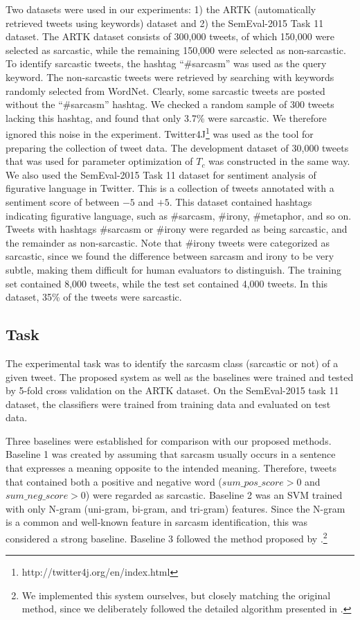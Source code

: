 \documentclass[english]{jnlp_1.4}
\begin{document}
Two datasets were used in our experiments: 1) the ARTK (automatically retrieved tweets using keywords) dataset and 2) the SemEval-2015 Task 11 dataset.
The ARTK dataset consists of 300,000 tweets, of which 150,000 were selected as sarcastic, while the remaining 150,000 were selected as non-sarcastic.
To identify sarcastic tweets, the hashtag ``\#sarcasm'' was used as the query keyword.
The non-sarcastic tweets were retrieved by searching with keywords randomly selected from WordNet.
Clearly, some sarcastic tweets are posted without the ``\#sarcasm'' hashtag.
We checked a random sample of 300 tweets lacking this hashtag, and found that only 3.7\% were sarcastic.
We therefore ignored this noise in the experiment.
Twitter4J\footnote{http://twitter4j.org/en/index.html} was used as the tool for preparing the collection of tweet data.
The development dataset of 30,000 tweets that was used for parameter optimization of $T_c$ was constructed in the same way.
We also used the SemEval-2015 Task 11 dataset for sentiment analysis of figurative language in Twitter.
This is a collection of tweets annotated with a sentiment score of between $-5$ and $+5$.
This dataset contained hashtags indicating figurative language, such as \#sarcasm, \#irony, \#metaphor, and so on.
Tweets with hashtags \#sarcasm or \#irony were regarded as being sarcastic, and the remainder as non-sarcastic.
Note that \#irony tweets were categorized as sarcastic, since we found the difference between sarcasm and irony to be very subtle, making them difficult for human evaluators to distinguish.
The training set contained 8,000 tweets, while the test set contained 4,000 tweets.
In this dataset, 35\% of the tweets were sarcastic.


\subsection{Task}

The experimental task was to identify the sarcasm class (sarcastic or not) of a given tweet.
The proposed system as well as the baselines were trained and tested by 5-fold cross validation on the ARTK dataset.
On the SemEval-2015 task 11 dataset, the classifiers were trained from training data and evaluated on test data.

Three baselines were established for comparison with our proposed methods.
Baseline 1 was created by assuming that sarcasm usually occurs in a sentence that expresses a meaning opposite to the intended meaning.
Therefore, tweets that contained both a positive and negative word ($sum\_pos\_score > 0$ and $sum\_neg\_score > 0$) were regarded as sarcastic.
Baseline 2 was an SVM trained with only N-gram (uni-gram, bi-gram, and tri-gram) features.
Since the N-gram is a common and well-known feature in sarcasm identification, this was considered a strong baseline.
Baseline 3 followed the method proposed by .\footnote{We implemented this system ourselves, but closely matching the original method, since we deliberately followed the detailed algorithm presented in .}
\end{document}
